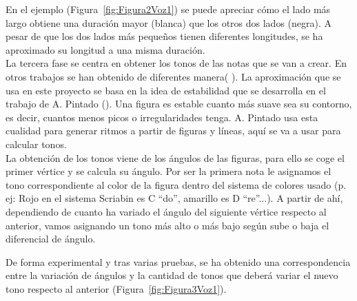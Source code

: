 En el ejemplo (Figura~\ref{fig:Figura2Voz1}) se puede apreciar cómo el lado más largo obtiene una duración mayor (blanca) que los otros dos lados (negra). A pesar de que los dos lados más pequeños tienen diferentes longitudes, se ha aproximado su longitud a una misma duración.\\

La tercera fase se centra en obtener los tonos de las notas que se van a crear. En otros trabajos se han obtenido de diferentes manera(\cite{bricksConvertsMusic} \cite{ImageBaseComposition}). La aproximación que se usa en este proyecto se basa en la idea de estabilidad que se desarrolla en el trabajo de A. Pintado (\cite{portutesis}). Una figura es estable cuanto más suave sea su contorno, es decir, cuantos menos picos o irregularidades tenga. A. Pintado usa esta cualidad para generar ritmos a partir de figuras y líneas, aquí se va a usar para calcular tonos.\\

La obtención de los tonos viene de los ángulos de las figuras, para ello se coge el primer vértice y se calcula su ángulo. Por ser la primera nota le asignamos el tono correspondiente al color de la figura dentro del sistema de colores usado (p. ej: Rojo en el sistema Scriabin es C ``do'', amarillo es D ``re''...). A partir de ahí, dependiendo de cuanto ha variado el ángulo del siguiente vértice respecto al anterior, vamos asignando un tono más alto o más bajo según sube o baja el diferencial de ángulo.

De forma experimental y tras varias pruebas, se ha obtenido una correspondencia entre la variación de ángulos y la cantidad de tonos que deberá variar el nuevo tono respecto al anterior (Figura~\ref{fig:Figura3Voz1}). 

